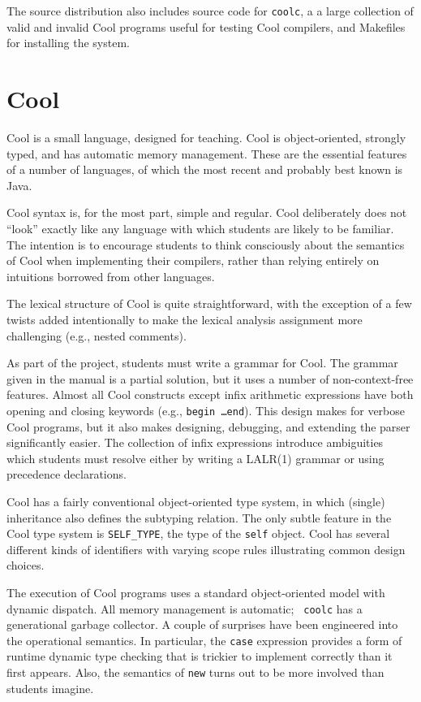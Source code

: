 \documentclass[11pt]{article}
\begin{document}
The source distribution also includes source code for {\tt coolc}, a
a large collection of valid and invalid Cool programs useful for
testing Cool compilers, and Makefiles for installing the system.

\section{Cool}

Cool is a small language, designed for teaching.  Cool is
object-oriented, strongly typed, and has automatic memory management.
These are the essential features of a number of languages, of which
the most recent and probably best known is Java.

Cool syntax is, for the most part, simple and regular.  Cool
deliberately does not ``look'' exactly like any language with which
students are likely to be familiar.  The intention is to encourage
students to think consciously about the semantics of Cool when
implementing their compilers, rather than relying entirely on
intuitions borrowed from other languages.

The lexical structure of Cool is quite straightforward, with the exception
of a few twists added intentionally to make the lexical analysis
assignment more challenging (e.g., nested comments).

As part of the project, students must write a grammar for Cool.  The
grammar given in the manual is a partial solution, but it uses a
number of non-context-free features.  Almost all Cool constructs
except infix arithmetic expressions have both opening and closing
keywords (e.g., {\tt begin \ldots end}).  This design makes for
verbose Cool programs, but it also makes designing, debugging, and extending the
parser significantly easier.  The collection of infix expressions
introduce ambiguities which students must resolve either by writing a
LALR(1) grammar or using precedence declarations.

Cool has a fairly conventional object-oriented type system, in which
(single) inheritance also defines the subtyping relation.  The only
subtle feature in the Cool type system is {\tt SELF\_TYPE}, the type
of the {\tt self} object.  Cool has several different kinds of
identifiers with varying scope rules illustrating common design
choices.

The execution of Cool programs uses a standard object-oriented model
with dynamic dispatch.  All memory management is automatic; {\tt
coolc} has a generational garbage collector.  A couple of surprises
have been engineered into the operational semantics.  In particular,
the {\tt case} expression provides a form of runtime dynamic type
checking that is trickier to implement correctly than it first
appears.  Also, the semantics of {\tt new} turns out to be more
involved than students imagine.
\end{document}
